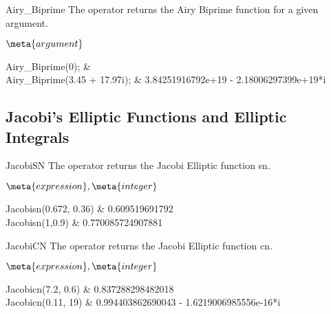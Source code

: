 \begin{Operator}{Airy_Biprime}
The  operator returns the Airy Biprime function for a
given argument.

\begin{Syntax}
\(\meta{argument}\)
\end{Syntax}

\begin{Examples}
Airy_Biprime(0);              &             \\
Airy_Biprime(3.45 + 17.97i); & 3.84251916792e+19 - 2.18006297399e+19*i\\
\end{Examples}

\end{Operator}

\subsection{Jacobi's Elliptic Functions and Elliptic Integrals}

\begin{Operator}{JacobiSN}
The  operator returns the Jacobi Elliptic function sn.

\begin{Syntax}
\(\meta{expression},\meta{integer}\)
\end{Syntax}

\begin{Examples}
Jacobisn(0.672, 0.36)    & 0.609519691792 \\
Jacobisn(1,0.9)          & 0.770085724907881 \\
\end{Examples}

\end{Operator}

\begin{Operator}{JacobiCN}
The  operator returns the Jacobi Elliptic function cn.

\begin{Syntax}
\(\meta{expression},\meta{integer}\)
\end{Syntax}

\begin{Examples}
Jacobicn(7.2, 0.6)      & 0.837288298482018  \\
Jacobicn(0.11, 19)      & 0.994403862690043 - 1.6219006985556e-16*i  \\
\end{Examples}

\end{Operator}


